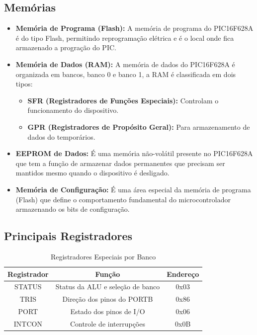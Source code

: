 \documentclass[12pt,a4paper]{book}
\begin{document}
\subsection{Memórias}
\begin{itemize}
    \item \textbf{Memória de Programa (Flash):} A memória de programa do PIC16F628A é do tipo Flash, permitindo reprogramação elétrica e é o local onde fica armazenado a progração do PIC.
    \item \textbf{Memória de Dados (RAM):} A memória de dados do PIC16F628A é organizada em bancos, banco 0 e banco 1, a RAM é classificada em dois tipos:
    \begin{itemize}
        \item \textbf{SFR (Registradores de Funções Especiais):} Controlam o funcionamento do dispositivo.
        \item \textbf{GPR (Registradores de Propósito Geral):} Para armazenamento de dados do temporários.
    \end{itemize}
    \item \textbf{EEPROM de Dados:} É uma memória não-volátil presente no PIC16F628A que tem a função de armazenar dados permanentes que precisam ser mantidos mesmo quando o dispositivo é desligado.
    \item \textbf{Memória de Configuração:} É uma área especial da memória de programa (Flash) que define o comportamento fundamental do microcontrolador armazenando os bits de configuração.
\end{itemize}
\subsection{Principais Registradores}
\begin{table}[H]
  \centering
  \begin{tabular}{|c|c|c|}
  \hline
  \textbf{Registrador} & \textbf{Função} & \textbf{Endereço} \\
  \hline
  STATUS & Status da ALU e seleção de banco & 0x03 \\
  \hline
  TRIS & Direção dos pinos do PORTB & 0x86 \\
  \hline
  PORT & Estado dos pinos de I/O & 0x06 \\
  \hline
  INTCON & Controle de interrupções & 0x0B \\
  \hline
  \end{tabular}
  \caption{Registradores Especiais por Banco}
  \label{tab:bancos_memoria}
\end{table}
\end{document}
